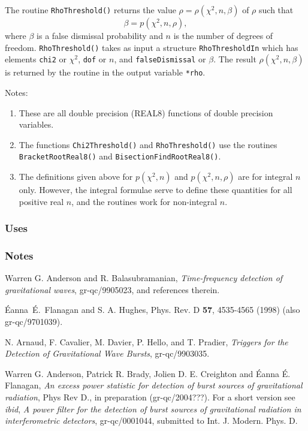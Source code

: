 The routine \verb+RhoThreshold()+ returns the value $\rho =
\rho(\chi^2,n,\beta)$ of $\rho$ such that 
$$
\beta = p(\chi^2,n,\rho),
$$
where $\beta$ is a false dismissal probability and $n$ is the number
of degrees of freedom.  \verb+RhoThreshold()+ takes as input a
structure \verb+RhoThresholdIn+ which has elements \verb+chi2+ or
$\chi^2$, \verb+dof+ or $n$, and \verb+falseDismissal+ or $\beta$.
The result $\rho(\chi^2,n,\beta)$ is returned by the routine in the
output variable \verb+*rho+. 


Notes:
\begin{enumerate}
\item These are all double precision (REAL8) functions of double
precision variables.
\item The functions \verb+Chi2Threshold()+ and \verb+RhoThreshold()+
use the routines \verb+BracketRootReal8()+ and
\verb+BisectionFindRootReal8()+. 
\item The definitions given above for $p(\chi^2,n)$ and
$p(\chi^2,n,\rho)$ are for integral $n$ only.  However,
the integral formulae serve to define these quantities for all
positive real $n$, and the routines work for non-integral $n$.
\end{enumerate}

\subsubsection*{Uses}

\subsubsection*{Notes}

\vfill{\footnotesize}







\newpage
\begin{thebibliography}{0}
Warren G. Anderson and R. Balasubramanian, \textit{Time-frequency
detection of gravitational waves}, gr-qc/9905023, and references
therein. 

\'Eanna~\'E.~Flanagan and S. A. Hughes, Phys. Rev. D {\bf 57},
4535-4565 (1998) (also gr-qc/9701039).  

N. Arnaud, F. Cavalier, M. Davier, P. Hello, and T. Pradier,
\textit{Triggers for the Detection of Gravitational Wave Bursts},
gr-qc/9903035.  

Warren G. Anderson, Patrick R. Brady, Jolien D. E. Creighton and 
{\'E}anna {\'E}. Flanagan, 
\textit{An excess power statistic for detection of burst sources of
gravitational radiation}, Phys Rev D., in preparation (gr-qc/2004???).
For a short version see {\it ibid}, \textit{A power filter for the
detection of burst sources of gravitational radiation in
interferometric detectors}, gr-qc/0001044, submitted to
Int. J. Modern. Phys. D. 

\end{thebibliography}

